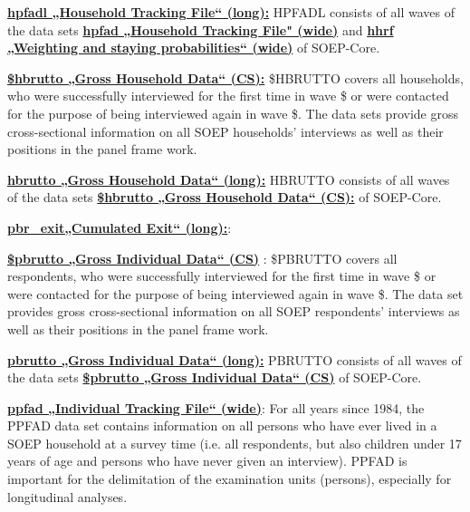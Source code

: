 \documentclass[letterpaper,10pt,openany,onesideH,english]{sphinxmanual}
\begin{document}
 \href{https://paneldata.org/soep-long/data/hpfadl}{\textbf{hpfadl „Household Tracking File“ (long):}} HPFADL consists of all waves of the data sets  \href{https://paneldata.org/soep-core/data/hpfad}{\textbf{hpfad „Household Tracking File" (wide)}} and  \href{https://paneldata.org/soep-core/data/hhrf}{\textbf{hhrf „Weighting and staying probabilities“ (wide)}} of SOEP-Core.

 \href{https://paneldata.org/soep-core/data/bghbrutto}{\textbf{\$hbrutto  „Gross Household Data“ (CS):}} \$HBRUTTO covers all households, who were successfully interviewed for the first time in wave \$ or were contacted for the purpose of being interviewed again in wave \$. The data sets provide gross cross-sectional information on all SOEP households’ interviews as well as their positions in the panel frame work.

 \href{https://paneldata.org/soep-long/data/hbrutto}{\textbf{hbrutto  „Gross Household Data“ (long):}} HBRUTTO consists of all waves of the data sets  \href{https://paneldata.org/soep-core/data/bghbrutto}{\textbf{\$hbrutto  „Gross Household Data“ (CS):}} of SOEP-Core.

 \href{https://paneldata.org/soep-long/data/pbr_exit}{\textbf{pbr\_exit„Cumulated Exit“ (long):}}:

 \href{https://paneldata.org/soep-core/data/bgpbrutto}{\textbf{\$pbrutto  „Gross Individual Data“ (CS)}} : \$PBRUTTO covers all respondents, who were successfully interviewed for the first time in wave \$ or were contacted for the purpose of being interviewed again in wave \$. The data set provides gross cross-sectional information on all SOEP respondents’ interviews as well as their positions in the panel frame work.

 \href{https://paneldata.org/soep-long/data/hbrutto}{\textbf{pbrutto  „Gross Individual Data“ (long):}} PBRUTTO consists of all waves of the data sets  \href{https://paneldata.org/soep-core/data/bgpbrutto}{\textbf{\$pbrutto  „Gross Individual Data“ (CS)}} of SOEP-Core.

 \href{https://paneldata.org/soep-core/data/ppfad}{\textbf{ppfad „Individual Tracking File“ (wide)}}: For all years since 1984, the PPFAD data set contains information on all persons who have ever lived in a SOEP household at a survey time (i.e. all respondents, but also children under 17 years of age and persons who have never given an interview). PPFAD is important for the delimitation of the examination units (persons), especially for longitudinal analyses.
\end{document}

